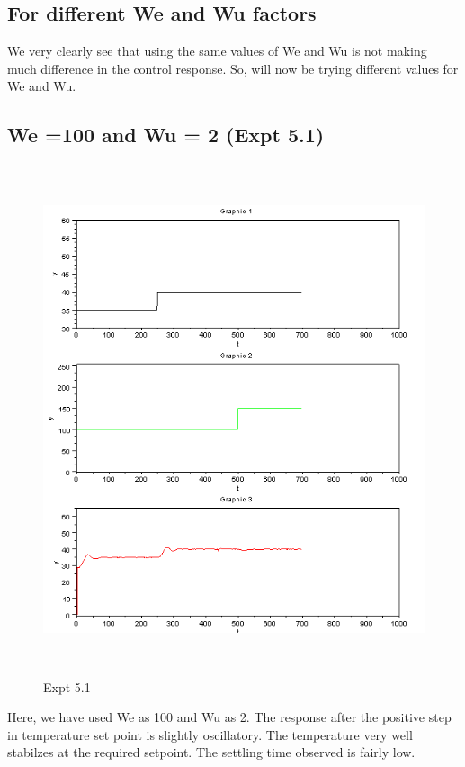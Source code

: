 \subsection{For different We and Wu factors}
We very clearly see that using the same values of We and Wu is not making much difference in the control response. So, will now be trying different values for We and Wu.
\subsection{We =100 and Wu = 2 (Expt 5.1) }
\begin{figure}[H]
  \includegraphics[width=12cm, height=15cm]{mpc/5_1.PNG}
  \caption{Expt 5.1}
\end{figure}
Here, we have used We as 100 and Wu as 2. The response after the positive step in temperature set point is slightly oscillatory. The temperature very well stabilzes at the required setpoint. The settling time observed is fairly low.

